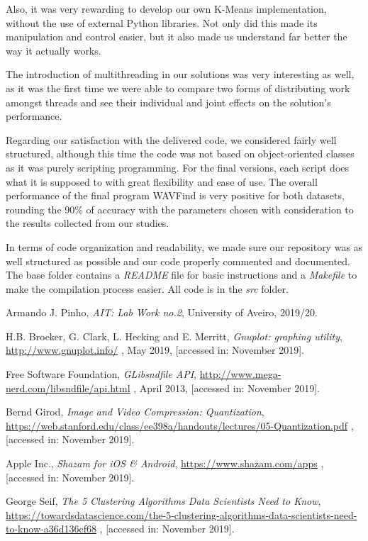 \documentclass[12pt]{article}
\begin{document}
Also, it was very rewarding to develop our own K-Means implementation, without 
the use of external Python libraries. 
Not only did this made its manipulation and control easier, but it also made us 
understand far better the way it actually works.

The introduction of multithreading in our solutions was very interesting as well,
as it was the first time we were able to compare two forms of distributing work
amongst threads and see their individual and joint effects on the solution's 
performance.

Regarding our satisfaction with the delivered code, we considered fairly well 
structured, although this time the code was not based on object-oriented classes
as it was purely scripting programming.
For the final versions, each script does what it is supposed to with great 
flexibility and ease of use.
The overall performance of the final program WAVFind is very positive for both
datasets, rounding the 90\% of accuracy with the parameters chosen with 
consideration to the results collected from our studies.

In terms of code organization and readability, we made sure our 
repository was as well structured as possible and our code properly commented
and documented.
The base folder contains a {\it README\/} file for basic instructions and a 
{\it Makefile\/} to make the compilation process easier.
All code is in the {\it src\/} folder.

\newpage
\begin{thebibliography}{9}
  

    Armando J. Pinho,
    \textit{AIT: Lab Work no.2},
    University of Aveiro,
    2019/20.
  
    H.B. Broeker, G. Clark, L. Hecking and E. Merritt,
    \textit{Gnuplot: graphing utility},
    \url{http://www.gnuplot.info/} ,
    May 2019,
    [accessed in: November 2019].

    Free Software Foundation,
    \textit{GLibsndfile API},
    \url{http://www.mega-nerd.com/libsndfile/api.html} ,
    April 2013,
    [accessed in: November 2019].

    Bernd Girod,
    \textit{Image and Video Compression: Quantization},
    \url{https://web.stanford.edu/class/ee398a/handouts/lectures/05-Quantization.pdf} ,
    [accessed in: November 2019].

    Apple Inc.,
    \textit{Shazam for iOS \& Android},
    \url{https://www.shazam.com/apps} ,
    [accessed in: November 2019].

    George Seif,
    \textit{The 5 Clustering Algorithms Data Scientists Need to Know},
    \url{https://towardsdatascience.com/the-5-clustering-algorithms-data-scientists-need-to-know-a36d136ef68} ,
    [accessed in: November 2019].

\end{thebibliography}

\clearpage
\end{document}
